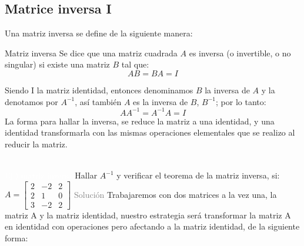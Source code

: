 \subsection{Matrice inversa I}
Una matriz inversa se define de la siguiente manera:
\begin{Theorem*} {Matriz inversa}
	Se dice que una matriz cuadrada $A$ es inversa (o invertible, o no singular) si existe una matriz $B$ tal que:
	$$
	AB = BA = I
	$$
\end{Theorem*}
Siendo I la matriz identidad, entonces denominamos $B$ la inversa de $A$ y la denotamos por $A^{-1}$, así también $A$ es la inversa de $B$, $B^{-1}$; por lo tanto:
$$
	AA^{-1}=A^{-1}A=I
$$
La forma para hallar la inversa, se reduce la matriz a una identidad, y una identidad transformarla con las mismas operaciones elementales que se realizo al reducir la matriz.\\\\
\addtocounter{exr}{1} 
\colorbox{gray!55}{\textcolor{white}{Ej.) matriz inversa}}
	Hallar $A^{-1}$ y verificar el teorema de la matriz inversa, si: 
	$
	A=\left[\begin{smallmatrix}
		2&-2&2\\
		2&1&0\\
		3&-2&2
	\end{smallmatrix}\right]
	$
\textcolor{gray}{Solución }
	Trabajaremos con dos matrices a la vez una, la matriz A y la matriz identidad, nuestro estrategia será transformar la matriz A en identidad con operaciones pero afectando a la matriz identidad, de la siguiente forma:
